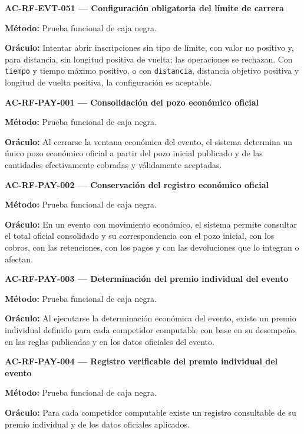 \documentclass[10pt,letterpaper]{article}
\begin{document}
\noindent\textbf{AC-RF-EVT-051 --- Configuración obligatoria del límite de carrera}\par
\textbf{Método:} Prueba funcional de caja negra.\par
\textbf{Oráculo:} Intentar abrir inscripciones sin tipo de límite, con valor no positivo y, para distancia, sin longitud positiva de vuelta; las operaciones se rechazan. Con \texttt{tiempo} y tiempo máximo positivo, o con \texttt{distancia}, distancia objetivo positiva y longitud de vuelta positiva, la configuración es aceptable.\par\vspace{0.45em}
\noindent\textbf{AC-RF-PAY-001 --- Consolidación del pozo económico oficial}\par
\textbf{Método:} Prueba funcional de caja negra.\par
\textbf{Oráculo:} Al cerrarse la ventana económica del evento, el sistema determina un único pozo económico oficial a partir del pozo inicial publicado y de las cantidades efectivamente cobradas y válidamente aceptadas.\par\vspace{0.45em}
\noindent\textbf{AC-RF-PAY-002 --- Conservación del registro económico oficial}\par
\textbf{Método:} Prueba funcional de caja negra.\par
\textbf{Oráculo:} En un evento con movimiento económico, el sistema permite consultar el total oficial consolidado y su correspondencia con el pozo inicial, con los cobros, con las retenciones, con los pagos y con las devoluciones que lo integran o afectan.\par\vspace{0.45em}
\noindent\textbf{AC-RF-PAY-003 --- Determinación del premio individual del evento}\par
\textbf{Método:} Prueba funcional de caja negra.\par
\textbf{Oráculo:} Al ejecutarse la determinación económica del evento, existe un premio individual definido para cada competidor computable con base en su desempeño, en las reglas publicadas y en los datos oficiales del evento.\par\vspace{0.45em}
\noindent\textbf{AC-RF-PAY-004 --- Registro verificable del premio individual del evento}\par
\textbf{Método:} Prueba funcional de caja negra.\par
\textbf{Oráculo:} Para cada competidor computable existe un registro consultable de su premio individual y de los datos oficiales aplicados.\par\vspace{0.45em}
\end{document}
